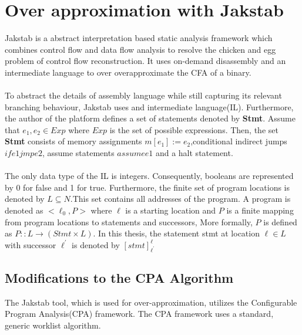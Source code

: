 \documentclass{kththesis}
\begin{document}
\section{Over approximation with Jakstab}
Jakstab\cite{JakstabGit} is a abstract interpretation based static analysis framework which combines control flow and data flow analysis to resolve the chicken and egg problem of control flow reconstruction. It uses on-demand disassembly and an intermediate language to over overapproximate the CFA of a binary.
\\ \\
To abstract the details of assembly language while still capturing its relevant branching behaviour, Jakstab uses and intermediate language(IL). Furthermore, the author of the platform defines a set of statements denoted by \textbf{Stmt}. Assume that $e_1,e_2 \in Exp$ where $Exp$ is the  set of possible expressions. Then, the set \textbf{Stmt} consists of memory assignments $m[e_1] := e_2$,conditional indirect jumps $if e1 jmp e2$, assume statements $assume e1$ and a halt statement.
\\ \\
The only data type of the IL is integers. Consequently, booleans are represented by 0 for false and 1 for true. Furthermore, the finite set of program locations is denoted by $L \subseteq N$.This set contains all addresses of the program. A program is denoted as $<\ell_0,P>$ where $\ell$ is a starting location and $P$ is a finite mapping from program locations to statements and successors, More formally, $P$ is defined as $P:: L \rightarrow (Stmt \times L)$. In this thesis, the statement stmt at location $\ell \in L$ with successor $\ell^{'}$ is denoted by $[stmt]^{\ell}_{\ell^{'}}$ 

\subsection{Modifications to the CPA Algorithm}
The Jakstab tool, which is used for over-approximation, utilizes the Configurable Program Analysis(CPA) framework\cite{cpaAlgo}. The CPA framework uses a standard, generic worklist algorithm.
\end{document}

